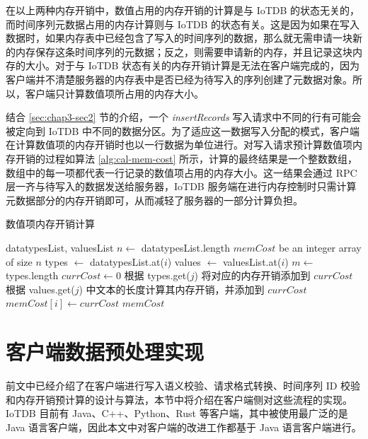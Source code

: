 在以上两种内存开销中，数值占用的内存开销的计算是与 IoTDB 的状态无关的，而时间序列元数据占用的内存计算则与 IoTDB 的状态有关。这是因为如果在写入数据时，如果内存表中已经包含了写入的时间序列的数据，那么就无需申请一块新的内存保存这条时间序列的元数据；反之，则需要申请新的内存，并且记录这块内存的大小。对于与 IoTDB 状态有关的内存开销计算是无法在客户端完成的，因为客户端并不清楚服务器的内存表中是否已经为待写入的序列创建了元数据对象。所以，客户端只计算数值项所占用的内存大小。

结合 \ref{sec:chap3-sec2} 节的介绍，一个 \emph{insertRecords} 写入请求中不同的行有可能会被定向到 IoTDB 中不同的数据分区。为了适应这一数据写入分配的模式，客户端在计算数值项的内存开销时也以一行数据为单位进行。对写入请求预计算数值项内存开销的过程如算法 \ref{alg:cal-mem-cost} 所示，计算的最终结果是一个整数数组，数组中的每一项都代表一行记录的数值项占用的内存大小。这一结果会通过 RPC 层一齐与待写入的数据发送给服务器，IoTDB 服务端在进行内存控制时只需计算元数据部分的内存开销即可，从而减轻了服务器的一部分计算负担。

\begin{algorithm}
  \caption{数值项内存开销计算}
  \label{alg:cal-mem-cost}
  \small
  \begin{algorithmic}
    \REQUIRE datatypesList, valuesList
    \STATE $n \leftarrow$ datatypesList.length
    \STATE $memCost$ be an integer array of size $n$
      \STATE types $\leftarrow$ datatypesList.at($i$)
      \STATE values $\leftarrow$ valuesList.at($i$)
      \STATE $m \leftarrow$ types.length
      \STATE $currCost \leftarrow 0$
        \STATE 根据 types.get($j$) 将对应的内存开销添加到 $currCost$
          \STATE 根据 values.get($j$) 中文本的长度计算其内存开销，并添加到 $currCost$
        \ENDIF 
      \ENDFOR
      \STATE $memCost[i] \leftarrow currCost$
    \ENDFOR
    \RETURN $memCost$
  \end{algorithmic}
\end{algorithm}

\section{客户端数据预处理实现}
前文中已经介绍了在客户端进行写入语义校验、请求格式转换、时间序列 ID 校验和内存开销预计算的设计与算法，本节中将介绍在客户端侧对这些流程的实现。IoTDB 目前有 Java、C++、Python、Rust 等客户端，其中被使用最广泛的是 Java 语言客户端，因此本文中对客户端的改进工作都基于 Java 语言客户端进行。

